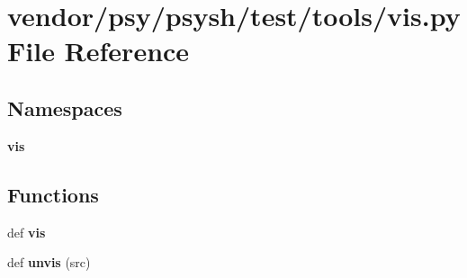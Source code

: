 \section{vendor/psy/psysh/test/tools/vis.py File Reference}
\label{vis_8py}
\subsection*{Namespaces}
\begin{DoxyCompactItemize}
\item 
 {\bf vis}
\end{DoxyCompactItemize}
\subsection*{Functions}
\begin{DoxyCompactItemize}
\item 
def {\bf vis}
\item 
def {\bf unvis} (src)
\end{DoxyCompactItemize}

